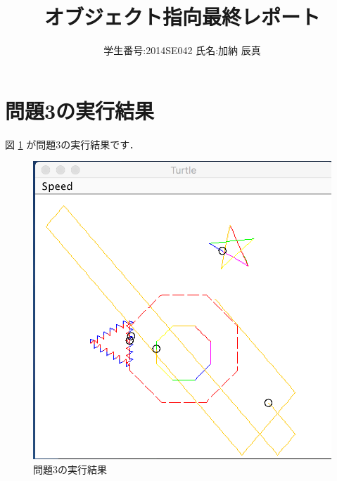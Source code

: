 \documentclass{jarticle}
\title{オブジェクト指向最終レポート}
\author{学生番号:2014SE042 氏名:加納 辰真}
\begin{document}
\maketitle

\newpage

\section{問題3の実行結果}
図 \ref{emb} が問題3の実行結果です．

\begin{figure}[ht]
  \begin{center}
    \includegraphics{ex3.png}
    \caption{問題3の実行結果}
    \label{emb}
  \end{center}
\end{figure}
\end{document}
